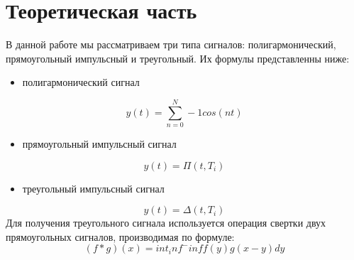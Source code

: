 \documentclass[10pt,a4paper]{report}
\begin{document}
\section  {Теоретическая часть}
В данной работе мы рассматриваем три типа сигналов: полигармонический, прямоугольный импульсный и треугольный. Их формулы представленны ниже:
\begin{itemize}
\item полигармонический сигнал 
\end{itemize}
\begin{displaymath}
y(t) = \sum_{n=0}^N-1 cos(nt)
\end{displaymath}
\begin{itemize}
\item прямоугольный импульсный сигнал
\end{itemize}
\begin{displaymath}
y(t) = \Pi (t,T_i)
\end{displaymath}
\begin{itemize}
\item треугольный импульсный сигнал
\end{itemize}
\begin{displaymath}
y(t) = \Delta (t,T_i)
\end{displaymath}
Для получения треугольного сигнала используется операция свертки двух прямоугольных сигналов, производимая по формуле:
\begin{displaymath}
(f*g)(x) = int_inf^-inf f(y)g(x-y)dy
\end{displaymath}
\end{document}
